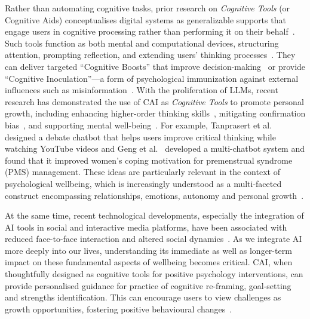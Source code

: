 \documentclass[manuscript,screen,review]{acmart}
\begin{document}
Rather than automating cognitive tasks, prior research on \emph{Cognitive Tools} (or Cognitive Aids) conceptualises digital systems as generalizable supports that engage users in cognitive processing rather than performing it on their behalf~\cite{cognitive_tools_for_learning_1992}. Such tools function as both mental and computational devices, structuring attention, prompting reflection, and extending users' thinking processes~\cite{flexible_cognitive_tools_1990}. They can deliver targeted ``Cognitive Boosts'' that improve decision-making~\cite{hertwig2017nudging} or provide ``Cognitive Inoculation''—a form of psychological immunization against external influences such as misinformation~\cite{shin2024algorithmic}.
With the proliferation of LLMs, recent research has demonstrated the use of CAI as \emph{Cognitive Tools} to promote personal growth, including enhancing higher-order thinking skills~\cite{tanprasert2024debate, wambsganss2021argueTutor}, mitigating confirmation bias~\cite{zhang2024see}, and supporting mental well-being~\cite{geng2025beyond, wester2025using}.
For example, Tanprasert et al.~\cite{tanprasert2024debate} designed a debate chatbot that helps users improve critical thinking while watching YouTube videos and Geng et al.~\cite{geng2025beyond} developed a multi-chatbot system and found that it improved women’s coping motivation for premenstrual syndrome (PMS) management.
These ideas are particularly relevant in the context of psychological wellbeing, which is increasingly understood as a multi-faceted construct encompassing relationships, emotions, autonomy and personal growth~\cite{Dr_M_Dhanabhakyam_2023}.

At the same time, recent technological developments, especially the integration of AI tools in social and interactive media platforms, have been associated with reduced face-to-face interaction and altered social dynamics~\cite{Nortei2025}. As we integrate AI more deeply into our lives, understanding its immediate as well as longer-term impact on these fundamental aspects of wellbeing becomes critical.
CAI, when thoughtfully designed as cognitive tools for positive psychology interventions, can provide personalised guidance for practice of cognitive re-framing, goal-setting and strengths identification. This can encourage users to view challenges as growth opportunities, fostering positive behavioural changes~\cite{narain2020promoting}.
\end{document}
